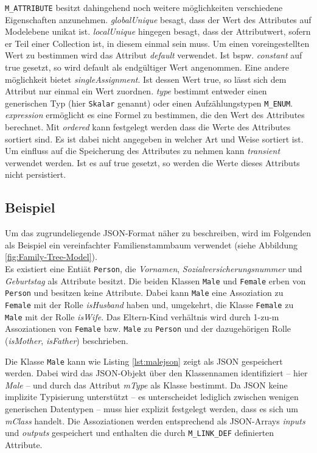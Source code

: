 \texttt{M\_ATTRIBUTE} besitzt dahingehend noch weitere m\"oglichkeiten verschiedene Eigenschaften anzunehmen. \textit{globalUnique} besagt, dass der Wert des Attributes auf Modelebene unikat ist. \textit{localUnique} hingegen besagt, dass der Attributwert, sofern er Teil einer Collection ist, in diesem einmal sein muss. Um einen voreingestellten Wert zu bestimmen wird das Attribut \textit{default} verwendet. Ist bspw. \textit{constant} auf true gesetzt, so wird default als endg\"ultiger Wert angenommen. Eine andere m\"oglichkeit bietet \textit{singleAssignment}. Ist dessen Wert true, so lässt sich dem Attribut nur einmal ein Wert zuordnen. \textit{type} bestimmt entweder einen generischen Typ (hier \texttt{Skalar} genannt) oder einen Aufz\"ahlungstypen \texttt{M\_ENUM}. \textit{expression} erm\"oglicht es eine Formel zu bestimmen, die den Wert des Attributes berechnet. Mit \textit{ordered} kann festgelegt werden dass die Werte des Attributes sortiert sind. Es ist dabei nicht angegeben in welcher Art und Weise sortiert ist. Um einfluss auf die Speicherung des Attributes zu nehmen kann \textit{transient} verwendet werden. Ist es auf true gesetzt, so werden die Werte dieses Attributs nicht persistiert. 


\subsection{Beispiel}
Um das zugrundeliegende JSON-Format n\"aher zu beschreiben, wird im Folgenden als Beispiel ein vereinfachter Familienstammbaum verwendet (siehe Abbildung \ref{fig:Family-Tree-Model}).\\ 
Es existiert eine Entiät \texttt{Person}, die \textit{Vornamen}, \textit{Sozialversicherungsnummer} und \textit{Geburtstag} als Attribute besitzt. Die beiden Klassen \texttt{Male} und \texttt{Female} erben von \texttt{Person} und besitzen keine Attribute. Dabei kann \texttt{Male} eine Assoziation zu \texttt{Female} mit der Rolle \textit{isHusband} haben und, umgekehrt, die Klasse \texttt{Female} zu \texttt{Male} mit der Rolle \textit{isWife}. Das Eltern-Kind verh\"altnis wird durch 1-zu-m Assoziationen von \texttt{Female} bzw. \texttt{Male} zu \texttt{Person} und der dazugeh\"origen Rolle (\textit{isMother}, \textit{isFather}) beschrieben.



Die Klasse \texttt{Male} kann wie Listing \ref{lst:malejson} zeigt als JSON gespeichert werden. Dabei wird das JSON-Objekt \"uber den Klassennamen identifiziert -- hier \textit{Male} -- und durch das Attribut \textit{mType} als Klasse bestimmt. Da JSON keine implizite Typisierung unterstützt -- es unterscheidet lediglich zwischen wenigen generischen Datentypen -- muss hier explizit festgelegt werden, dass es sich um \textit{mClass} handelt. Die Assoziationen werden entsprechend als JSON-Arrays \textit{inputs} und \textit{outputs} gespeichert und enthalten die durch \texttt{M\_LINK\_DEF} definierten Attribute.

